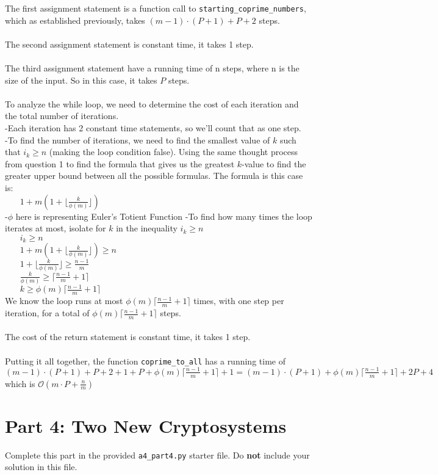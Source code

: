 \documentclass[fontsize=11pt]{article}
\newcommand{\cO}{\mathcal{O}}
\begin{document}
\begin{enumerate}
The first assignment statement is a function call to \texttt{starting\_coprime\_numbers}, which as established previously, takes $(m - 1) \cdot (P + 1) + P + 2$ steps. \\~\\

The second assignment statement is constant time, it takes 1 step. \\~\\

The third assignment statement have a running time of n steps, where n is the size of the input. So in this case, it takes $P$ steps. \\~\\

To analyze the while loop, we need to determine the cost of each iteration and the total number of iterations. \\
-Each iteration has 2 constant time statements, so we'll count that as one step. \\
-To find the number of iterations, we need to find the smallest value of $k$ such that $i_k \geq n$ (making the loop condition false). Using the same thought process from question 1 to find the formula that gives us the greatest $k$-value to find the greater upper bound between all the possible formulas. The formula is this case is:\\
$~~~~~~~~ 1 + m(1 + \lfloor\frac{k}{\phi(m)}\rfloor)$ \\
-$\phi$ here is representing Euler's Totient Function
-To find how many times the loop iterates at most, isolate for $k$ in the inequality $i_k \geq n$\\
$~~~~~~~~ i_k \geq n$ \\
$~~~~~~~~ 1 + m(1 + \lfloor\frac{k}{\phi(m)}\rfloor) \geq n$ \\
$~~~~~~~~ 1 + \lfloor\frac{k}{\phi(m)}\rfloor \geq \frac{n - 1}{m}$ \\
$~~~~~~~~ \frac{k}{\phi(m)} \geq \lceil\frac{n - 1}{m} + 1\rceil$ \\
$~~~~~~~~ k \geq \phi(m)\lceil\frac{n - 1}{m} + 1\rceil$ \\
We know the loop runs at most $\phi(m)\lceil\frac{n - 1}{m} + 1\rceil$ times, with one step per iteration, for a total of $\phi(m)\lceil\frac{n - 1}{m} + 1\rceil$ steps. \\~\\

The cost of the return statement is constant time, it takes 1 step. \\~\\

Putting it all together, the function \texttt{coprime\_to\_all} has a running time of \\
$(m - 1) \cdot (P + 1) + P + 2 + 1 + P + \phi(m)\lceil\frac{n - 1}{m} + 1\rceil + 1 = (m - 1) \cdot (P + 1) + \phi(m)\lceil\frac{n - 1}{m} + 1\rceil + 2P + 4$ \\
which is $\cO(m \cdot P + \frac{n}{m})$
\end{enumerate}

\section*{Part 4: Two New Cryptosystems}

Complete this part in the provided \texttt{a4\_part4.py} starter file.
Do \textbf{not} include your solution in this file.
\end{document}
